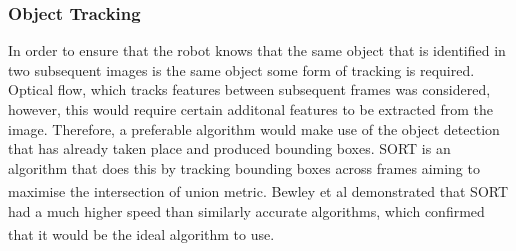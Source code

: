 \documentclass[11pt]{article}		%
\newcommand{\supercite}[1]{\textsuperscript{\cite{#1}}}		%
\newcommand{\figref}[1]{\hyperref[#1]{Figure \ref*{#1}}}    %
\begin{document}
	
	        
	        \subsubsection{Object Tracking}
	         In order to ensure that the robot knows that the same object that is identified in two subsequent images is the same object some form of tracking is required. Optical flow, which tracks features between subsequent frames was considered, however, this would require certain additonal features to be extracted from the image. Therefore, a preferable algorithm would make use of the object detection that has already taken place and produced bounding boxes. SORT is an algorithm that does this by tracking bounding boxes across frames aiming to maximise the intersection of union metric. Bewley et al \supercite{object_tracking} demonstrated that SORT had a much higher speed than similarly accurate algorithms, which confirmed that it would be the ideal algorithm to use.\supercite{object_tracking} 
	        
\end{document}
